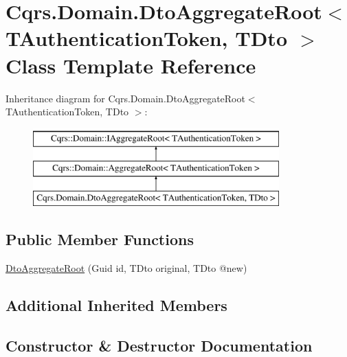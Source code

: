 \hypertarget{classCqrs_1_1Domain_1_1DtoAggregateRoot}{}\section{Cqrs.\+Domain.\+Dto\+Aggregate\+Root$<$ T\+Authentication\+Token, T\+Dto $>$ Class Template Reference}
\label{classCqrs_1_1Domain_1_1DtoAggregateRoot}
Inheritance diagram for Cqrs.\+Domain.\+Dto\+Aggregate\+Root$<$ T\+Authentication\+Token, T\+Dto $>$\+:\begin{figure}[H]
\begin{center}
\leavevmode
\includegraphics[height=3.000000cm]{classCqrs_1_1Domain_1_1DtoAggregateRoot}
\end{center}
\end{figure}
\subsection*{Public Member Functions}
\begin{DoxyCompactItemize}
\item 
\hyperlink{classCqrs_1_1Domain_1_1DtoAggregateRoot_aa99d95d5b4b1fb8a59beda77f7e12c20}{Dto\+Aggregate\+Root} (Guid id, T\+Dto original, T\+Dto @new)
\end{DoxyCompactItemize}
\subsection*{Additional Inherited Members}


\subsection{Constructor \& Destructor Documentation}
\mbox{\label{classCqrs_1_1Domain_1_1DtoAggregateRoot_aa99d95d5b4b1fb8a59beda77f7e12c20}} 
